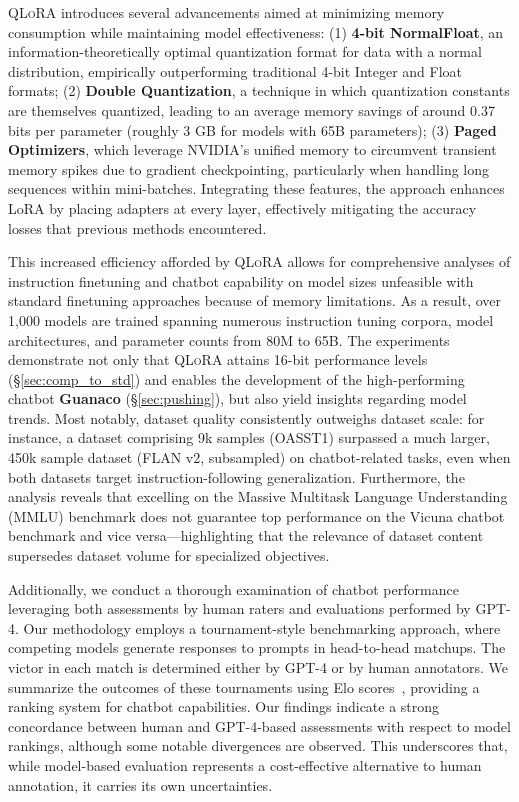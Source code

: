 \textsc{QLoRA} introduces several advancements aimed at minimizing memory consumption while maintaining model effectiveness: (1) \textbf{4-bit NormalFloat}, an information-theoretically optimal quantization format for data with a normal distribution, empirically outperforming traditional 4-bit Integer and Float formats; (2) \textbf{Double Quantization}, a technique in which quantization constants are themselves quantized, leading to an average memory savings of around 0.37 bits per parameter (roughly 3 GB for models with 65B parameters); (3) \textbf{Paged Optimizers}, which leverage NVIDIA’s unified memory to circumvent transient memory spikes due to gradient checkpointing, particularly when handling long sequences within mini-batches. Integrating these features, the approach enhances LoRA by placing adapters at every layer, effectively mitigating the accuracy losses that previous methods encountered.

This increased efficiency afforded by \textsc{QLoRA} allows for comprehensive analyses of instruction finetuning and chatbot capability on model sizes unfeasible with standard finetuning approaches because of memory limitations. As a result, over 1,000 models are trained spanning numerous instruction tuning corpora, model architectures, and parameter counts from 80M to 65B. The experiments demonstrate not only that \textsc{QLoRA} attains 16-bit performance levels (\S\ref{sec:comp_to_std}) and enables the development of the high-performing chatbot \textbf{Guanaco} (\S\ref{sec:pushing}), but also yield insights regarding model trends. Most notably, dataset quality consistently outweighs dataset scale: for instance, a dataset comprising 9k samples (OASST1) surpassed a much larger, 450k sample dataset (FLAN v2, subsampled) on chatbot-related tasks, even when both datasets target instruction-following generalization. Furthermore, the analysis reveals that excelling on the Massive Multitask Language Understanding (MMLU) benchmark does not guarantee top performance on the Vicuna chatbot benchmark and vice versa—highlighting that the relevance of dataset content supersedes dataset volume for specialized objectives.

Additionally, we conduct a thorough examination of chatbot performance leveraging both assessments by human raters and evaluations performed by GPT-4. Our methodology employs a tournament-style benchmarking approach, where competing models generate responses to prompts in head-to-head matchups. The victor in each match is determined either by GPT-4 or by human annotators. We summarize the outcomes of these tournaments using Elo scores~\citep{elo1967proposed, elo1978rating}, providing a ranking system for chatbot capabilities. Our findings indicate a strong concordance between human and GPT-4-based assessments with respect to model rankings, although some notable divergences are observed. This underscores that, while model-based evaluation represents a cost-effective alternative to human annotation, it carries its own uncertainties.

